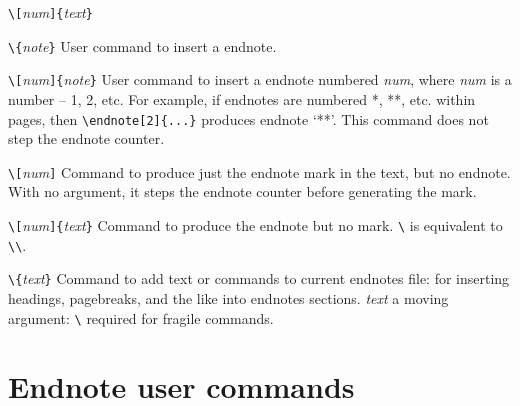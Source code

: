 \documentclass[pagesize=auto]{scrartcl}
\makeatletter
\newcommand*{\cs}[1]{\texttt{\textbackslash#1}}
\newcommand*{\cmd}[1]{\cs{\expandafter\@gobble\string#1}}
\newcommand*{\meta}[1]{\textlangle\textsl{#1}\textrangle}
\newcommand*{\marg}[1]{\texttt{\{}\meta{#1}\texttt{\}}}
\newcommand*{\oarg}[1]{\texttt{[}\meta{#1}\texttt{]}}
\makeatother
\begin{document}
\begin{labeling}[~:]{\cmd{\endnotetext}\oarg{num}\marg{text}}
  \item[\cmd{\endnote}\marg{note}] User command to insert a endnote.

  \item[\cmd{\endnote}\oarg{num}\marg{note}] User command to insert a endnote numbered
    \meta{num}, where \meta{num} is a number -- 1, 2,
    etc.  For example, if endnotes are numbered
    *, **, etc. within pages, then  \verb+\endnote[2]{...}+
    produces endnote `**'.  This command does  not
    step the endnote counter.

  \item[\cmd{\endnotemark}\oarg{num}] Command to produce just the endnote mark in
    the text, but no endnote.  With no argument,
    it steps the endnote counter before  generating
    the mark.

  \item[\cmd{\endnotetext}\oarg{num}\marg{text}] Command to produce the endnote but no
    mark.  \cmd{\endnote} is equivalent to
    \cmd{\endnotemark}\cmd{\endnotetext}.

  \item[\cmd{\addtoendnotes}\marg{text}] Command to add text or commands to current
    endnotes file: for inserting headings,
    pagebreaks, and the like into endnotes
    sections.  \meta{text} a moving argument:
    \cmd{\protect} required for fragile commands.
    
\end{labeling}


\section{Endnote user commands}
\end{document}
